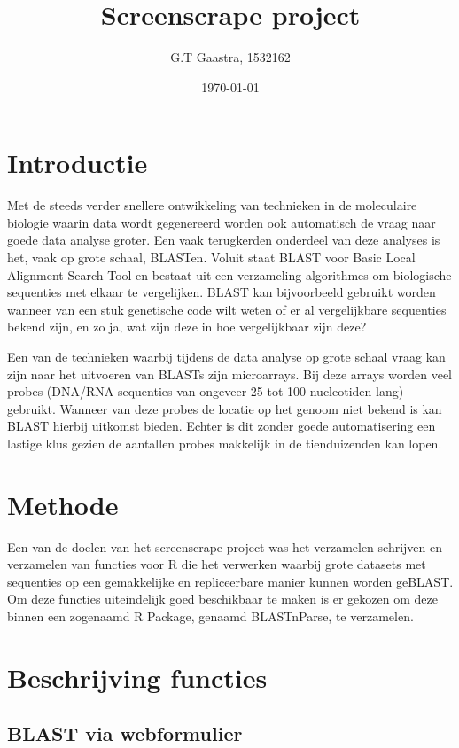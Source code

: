 \documentclass[a4paper]{article}
\title{Screenscrape project}
\author{G.T Gaastra, 1532162}
\date{\today}
\begin{document}
\maketitle


\section*{Introductie}

Met de steeds verder snellere ontwikkeling van technieken in de moleculaire biologie waarin data wordt gegenereerd worden ook automatisch de vraag naar goede data analyse groter. Een vaak terugkerden onderdeel van deze analyses is het, vaak op grote schaal, BLASTen. Voluit staat BLAST voor Basic Local Alignment Search Tool en bestaat uit een verzameling algorithmes om biologische sequenties met elkaar te vergelijken. BLAST kan bijvoorbeeld gebruikt worden wanneer van een stuk genetische code wilt weten of er al vergelijkbare sequenties bekend zijn, en zo ja, wat zijn deze in hoe vergelijkbaar zijn deze?

Een van de technieken waarbij tijdens de data analyse op grote schaal vraag kan zijn naar het uitvoeren van BLASTs zijn microarrays. Bij deze arrays worden veel probes (DNA/RNA sequenties van ongeveer 25 tot 100 nucleotiden lang) gebruikt. Wanneer van deze probes de locatie op het genoom niet bekend is kan BLAST hierbij uitkomst bieden. Echter is dit zonder goede automatisering een lastige klus gezien de aantallen probes makkelijk in de tienduizenden kan lopen. 

\section*{Methode}

Een van de doelen van het screenscrape project was het verzamelen schrijven en verzamelen van functies voor R\cite{Rcran} die het verwerken waarbij grote datasets met sequenties op een gemakkelijke en repliceerbare manier kunnen worden geBLAST.  Om deze functies uiteindelijk goed beschikbaar te maken is er gekozen om deze binnen een zogenaamd R Package, genaamd BLASTnParse, te verzamelen.
\section*{Beschrijving functies}
\subsection*{BLAST via webformulier}
\end{document}
